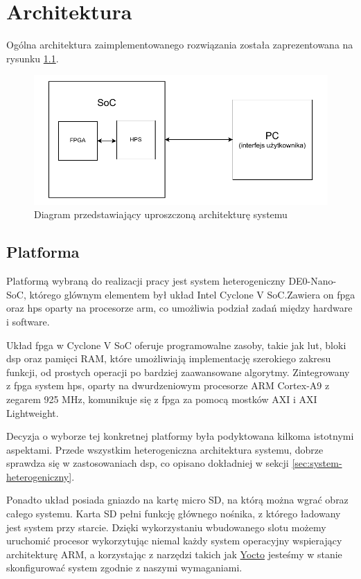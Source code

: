 \chapter{Architektura}
\label{cha:architektura}

Ogólna architektura zaimplementowanego rozwiązania została zaprezentowana na rysunku \ref{fig:ogolna-architektura}.
\begin{figure}[!htb]
    \centerline{\includegraphics[scale=0.9]{system.pdf}}
    \caption{Diagram przedstawiający uproszczoną architekturę systemu}
    \label{fig:ogolna-architektura}
\end{figure}

\section{Platforma}
\label{sec:platforma}
Platformą wybraną do realizacji pracy jest system heterogeniczny DE0-Nano-SoC, którego glównym elementem był układ Intel Cyclone V SoC.Zawiera on \ac{fpga} oraz \ac{hps} oparty na procesorze \acs{arm}, co umożliwia podział zadań między hardware i software.

Układ \ac{fpga} w Cyclone V SoC oferuje programowalne zasoby, takie jak \ac{lut}, bloki \ac{dsp} oraz pamięci RAM, które umożliwiają implementację szerokiego zakresu funkcji, od prostych operacji po bardziej zaawansowane algorytmy. Zintegrowany z \ac{fpga} system \ac{hps}, oparty na dwurdzeniowym procesorze ARM Cortex-A9 z zegarem 925 MHz, komunikuje się z \ac{fpga} za pomocą mostków AXI i AXI Lightweight.

Decyzja o wyborze tej konkretnej platformy była podyktowana kilkoma istotnymi aspektami. Przede wszystkim heterogeniczna architektura systemu, dobrze sprawdza się w zastosowaniach \ac{dsp}, co opisano dokładniej w sekcji \ref{sec:system-heterogeniczny}.

Ponadto układ posiada gniazdo na kartę micro SD, na którą można wgrać obraz całego systemu. Karta SD pełni funkcję głównego nośnika, z którego ładowany jest system przy starcie. Dzięki wykorzystaniu wbudowanego slotu możemy uruchomić procesor wykorzytując niemal każdy system operacyjny wspierający architekturę ARM, a korzystając z narzędzi takich jak \hyperref[sec:linux-embedded]{Yocto} jesteśmy w stanie skonfigurować system zgodnie z naszymi wymaganiami.

